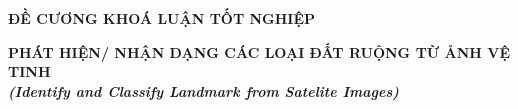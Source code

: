 \documentclass{article}[14pt]
\begin{document}
	
	\begin{figure}[h]
		\begin{floatrow}
			{%
				
			}
			{%
				
			}
		\end{floatrow}
	\end{figure}
	
	\begin{center}
		\textbf{\Large ĐỀ CƯƠNG KHOÁ LUẬN TỐT NGHIỆP} \\ 
	\end{center}
	
	
	\begin{center}
		
		\textbf{\huge PHÁT HIỆN/ NHẬN DẠNG CÁC LOẠI ĐẤT RUỘNG TỪ ẢNH VỆ TINH } 
		\\
		
		\vspace{.5cm}
		\textit{\textbf{\Large (Identify and Classify Landmark from Satelite Images)}}
	\end{center}
	
	\vspace{.5cm}
	
	\Large
\end{document}
